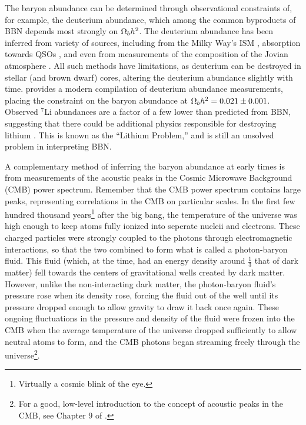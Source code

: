 

The baryon abundance can be determined through observational
constraints of, for example, the deuterium abundance, which among the
common byproducts of BBN depends most strongly on $\Omega_b h^2$. The
deuterium abundance has been inferred from variety of sources,
including from the Milky Way's ISM \citep{Linsky1993, Linsky1995},
absorption towards QSOs \citep{Tytler1996, Kirkman2003}, and even from
measurements of the composition of the Jovian atmosphere
\citep{Niemann1996}. All such methods have limitations, as deuterium
can be destroyed in stellar (and brown dwarf) cores, altering the
deuterium abundance slightly with time. \citet{Iocco2009} provides a
modern compilation of deuterium abundance measurements, placing the
constraint on the baryon abundance at $\Omega_b h^2 = 0.021 \pm
0.001$. Observed $^7$Li abundances are a factor of a few lower than
predicted from BBN, suggesting that there could be additional physics
responsible for destroying lithium \citep{Suzuki2000,
  Melendez2004}. This is known as the ``Lithium Problem,'' and is
still an unsolved problem in interpreting BBN.

A complementary method of inferring the baryon abundance at early
times is from measurements of the acoustic peaks in the Cosmic
Microwave Background (CMB) power spectrum. Remember that the CMB power
spectrum contains large peaks, representing correlations in the CMB on
particular scales. In the first few hundred thousand
years\footnote{Virtually a cosmic blink of the eye.} after the big
bang, the temperature of the universe was high enough to keep atoms
fully ionized into seperate nucleii and electrons. These charged
particles were strongly coupled to the photons through electromagnetic
interactions, so that the two combined to form what is called a
photon-baryon fluid. This fluid (which, at the time, had an energy
density around $\frac{1}{3}$ that of dark matter) fell towards the
centers of gravitational wells created by dark matter. However, unlike
the non-interacting dark matter, the photon-baryon fluid's pressure
rose when its density rose, forcing the fluid out of the well
until its pressure dropped enough to allow gravity to draw it back
once again. These ongoing fluctuations in the pressure and density
of the fluid were frozen into the CMB when the average temperature of
the universe dropped sufficiently to allow neutral atoms to form, and
the CMB photons began streaming freely through the
universe\footnote{For a good, low-level introduction to the concept of
  acoustic peaks in the CMB, see Chapter 9 of \citet{Ryden2003}.}.

